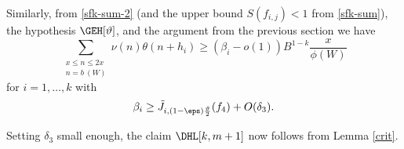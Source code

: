 Similarly, from \eqref{sfk-sum-2} (and the upper bound $S(f_{i,j}) < 1$ from \eqref{sfk-sum}), the hypothesis $\GEH[\vartheta]$, and the argument from the previous section we have
$$ 
 \sum_{\substack{x \leq n \leq 2x\\ n = b\ (W)}} \nu(n) \theta(n+h_i) \geq (\beta_i - o(1)) B^{1-k} \frac{x}{\phi(W)}$$
for $i=1,\dots,k$ with
$$ \beta_i \geq \tilde J_{i, (1-\eps) \frac{\vartheta}{2}}( f_4 ) + O(\delta_3).$$

Setting $\delta_3$ small enough, the claim $\DHL[k,m+1]$ now follows from Lemma \ref{crit}.